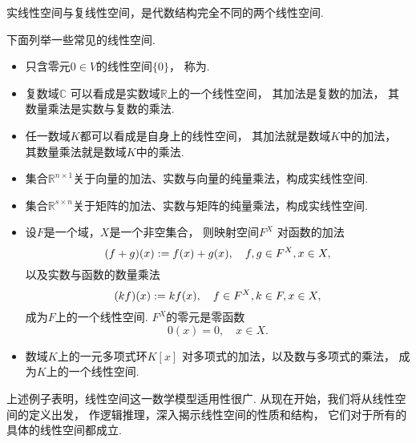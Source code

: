 实线性空间与复线性空间，是代数结构完全不同的两个线性空间.

\begin{example}
下面列举一些常见的线性空间.
\begin{itemize}
	\item 只含零元\(0 \in V\)的线性空间\(\{0\}\)，
	称为.

	\item 复数域\(\mathbb{C}\)
	可以看成是实数域\(\mathbb{R}\)上的一个线性空间，
	其加法是复数的加法，
	其数量乘法是实数与复数的乘法.

	\item 任一数域\(K\)都可以看成是自身上的线性空间，
	其加法就是数域\(K\)中的加法，
	其数量乘法就是数域\(K\)中的乘法.

	\item 集合\(\mathbb{R}^{n \times 1}\)关于向量的加法、实数与向量的纯量乘法，构成实线性空间.

	\item 集合\(\mathbb{R}^{s \times n}\)关于矩阵的加法、实数与矩阵的纯量乘法，构成实线性空间.

	\item 设\(F\)是一个域，\(X\)是一个非空集合，
	则映射空间\(F^X\)
	对函数的加法\begin{equation*}
		(f+g)(x) := f(x) + g(x),
		\quad f,g \in F^X, x \in X,
	\end{equation*}
	以及实数与函数的数量乘法\begin{equation*}
		(k f)(x) := k f(x),
		\quad f \in F^X, k \in F, x \in X,
	\end{equation*}
	成为\(F\)上的一个线性空间.
	\(F^X\)的零元是零函数\begin{equation*}
		0(x) = 0,
		\quad x \in X.
	\end{equation*}

	\item 数域\(K\)上的一元多项式环\(K[x]\)
	对多项式的加法，以及数与多项式的乘法，
	成为\(K\)上的一个线性空间.
\end{itemize}
\end{example}

上述例子表明，线性空间这一数学模型适用性很广.
从现在开始，我们将从线性空间的定义出发，
作逻辑推理，深入揭示线性空间的性质和结构，
它们对于所有的具体的线性空间都成立.

